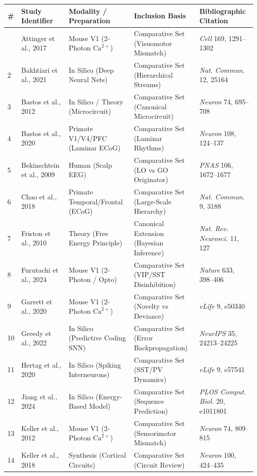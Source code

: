\documentclass[12pt]{article}
\begin{document}
\begin{longtable}[]{@{}lllll@{}}
\toprule
\textbf{\#} & \textbf{Study Identifier} & \textbf{Modality / Preparation} & \textbf{Inclusion Basis} & \textbf{Bibliographic Citation} \\
\midrule
\endhead
\bottomrule
\endlastfoot
1 & Attinger et al., 2017 & Mouse V1 (2-Photon $\text{Ca}^{2+}$) & Comparative Set (Visuomotor Mismatch) & \emph{Cell} 169, 1291--1302 \\
2 & Bakhtiari et al., 2021 & In Silico (Deep Neural Nets) & Comparative Set (Hierarchical Streams) & \emph{Nat. Commun.} 12, 25164 \\
3 & Bastos et al., 2012 & In Silico / Theory (Microcircuit) & Comparative Set (Canonical Microcircuit) & \emph{Neuron} 74, 695--708 \\
4 & Bastos et al., 2020 & Primate V1/V4/PFC (Laminar ECoG) & Comparative Set (Laminar Rhythms) & \emph{Neuron} 108, 124--137 \\
5 & Bekinschtein et al., 2009 & Human (Scalp EEG) & Comparative Set (LO vs GO Originator) & \emph{PNAS} 106, 1672--1677 \\
6 & Chao et al., 2018 & Primate Temporal/Frontal (ECoG) & Comparative Set (Large-Scale Hierarchy) & \emph{Nat. Commun.} 9, 3188 \\
7 & Friston et al., 2010 & Theory (Free Energy Principle) & Canonical Extension (Bayesian Inference) & \emph{Nat. Rev. Neurosci.} 11, 127 \\
8 & Furutachi et al., 2024 & Mouse V1 (2-Photon / Opto) & Comparative Set (VIP/SST Disinhibition) & \emph{Nature} 633, 398--406 \\
9 & Garrett et al., 2020 & Mouse V1 (2-Photon $\text{Ca}^{2+}$) & Comparative Set (Novelty vs Deviance) & \emph{eLife} 9, e50340 \\
10 & Greedy et al., 2022 & In Silico (Predictive Coding SNN) & Comparative Set (Error Backpropagation) & \emph{NeurIPS} 35, 24213--24225 \\
11 & Hertag et al., 2020 & In Silico (Spiking Interneurons) & Comparative Set (SST/PV Dynamics) & \emph{eLife} 9, e57541 \\
12 & Jiang et al., 2024 & In Silico (Energy-Based Model) & Comparative Set (Sequence Prediction) & \emph{PLOS Comput. Biol.} 20, e1011801 \\
13 & Keller et al., 2012 & Mouse V1 (2-Photon $\text{Ca}^{2+}$) & Comparative Set (Sensorimotor Mismatch) & \emph{Neuron} 74, 809--815 \\
14 & Keller et al., 2018 & Synthesis (Cortical Circuits) & Comparative Set (Circuit Review) & \emph{Neuron} 100, 424--435 \\

\end{longtable}
\end{document}
